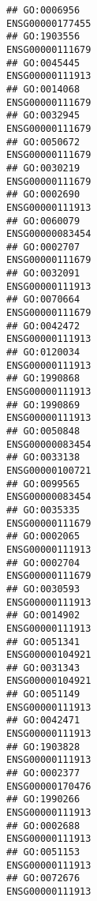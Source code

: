\documentclass[
]{article}
\begin{document}
\begin{verbatim}
## GO:0006956                                                 ENSG00000177455
## GO:1903556                                                 ENSG00000111679
## GO:0045445                                                 ENSG00000111913
## GO:0014068                                                 ENSG00000111679
## GO:0032945                                                 ENSG00000111679
## GO:0050672                                                 ENSG00000111679
## GO:0030219                                                 ENSG00000111679
## GO:0002690                                                 ENSG00000111913
## GO:0060079                                                 ENSG00000083454
## GO:0002707                                                 ENSG00000111679
## GO:0032091                                                 ENSG00000111913
## GO:0070664                                                 ENSG00000111679
## GO:0042472                                                 ENSG00000111913
## GO:0120034                                                 ENSG00000111913
## GO:1990868                                                 ENSG00000111913
## GO:1990869                                                 ENSG00000111913
## GO:0050848                                                 ENSG00000083454
## GO:0033138                                                 ENSG00000100721
## GO:0099565                                                 ENSG00000083454
## GO:0035335                                                 ENSG00000111679
## GO:0002065                                                 ENSG00000111913
## GO:0002704                                                 ENSG00000111679
## GO:0030593                                                 ENSG00000111913
## GO:0014902                                                 ENSG00000111913
## GO:0051341                                                 ENSG00000104921
## GO:0031343                                                 ENSG00000104921
## GO:0051149                                                 ENSG00000111913
## GO:0042471                                                 ENSG00000111913
## GO:1903828                                                 ENSG00000111913
## GO:0002377                                                 ENSG00000170476
## GO:1990266                                                 ENSG00000111913
## GO:0002688                                                 ENSG00000111913
## GO:0051153                                                 ENSG00000111913
## GO:0072676                                                 ENSG00000111913

\end{verbatim}
\end{document}

